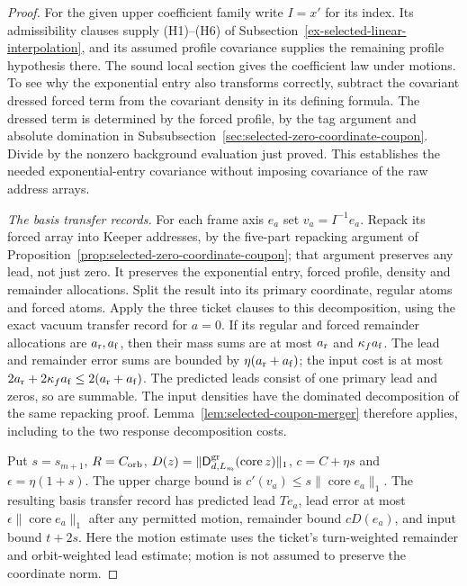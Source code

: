 \begin{proof}
For the given upper coefficient family write $I=x'$ for its index. Its admissibility
clauses supply (H1)--(H6) of
Subsection~\ref{ex-selected-linear-interpolation}, and its assumed
profile covariance supplies the remaining profile hypothesis there.
The sound local section gives the coefficient law under motions.
To see why the exponential entry also transforms correctly, subtract
the covariant dressed forced term from the covariant density in its
defining formula. The dressed term is determined by the forced
profile, by the tag argument and absolute domination in
Subsubsection~\ref{sec:selected-zero-coordinate-coupon}. Divide by the
nonzero background evaluation just proved. This establishes the
needed exponential-entry covariance without imposing covariance of
the raw address arrays.

\emph{The basis transfer records.}
For each frame axis $e_a$ set $v_a=I^{-1}e_a$. Repack its forced
array into Keeper addresses, by the five-part repacking argument of
Proposition~\ref{prop:selected-zero-coordinate-coupon}; that argument
preserves any lead, not just zero. It preserves the exponential
entry, forced profile, density and remainder allocations. Split the
result into its primary coordinate, regular atoms and forced atoms.
Apply the three ticket clauses to this decomposition, using the exact
vacuum transfer record for $a=0$. If its regular and forced remainder
allocations are $a_{\rm r},a_{\rm f}$, then their mass sums are
at most $a_{\rm r}$ and $\kappa_f a_{\rm f}$. The lead and remainder
error sums are bounded by $\eta(a_{\rm r}+a_{\rm f})$; the input
cost is at most $2a_{\rm r}+2\kappa_f a_{\rm f}\le2(a_{\rm r}+a_{\rm f})$.
The predicted leads consist of one primary lead and zeros, so are
summable. The input densities have the dominated decomposition of
the same repacking proof. Lemma~\ref{lem:selected-coupon-merger}
therefore applies, including to the two response decomposition costs.

Put $s=s_{m+1}$, $R=C_{\rm orb}$,
$D(z)=\|\mathsf D^{\rm gr}_{d,L_m}(\operatorname{core}z)\|_1$,
$c=C+\eta s$ and $\epsilon=\eta(1+s)$.
The upper charge bound is $c'(v_a)\le s\|\operatorname{core}e_a\|_1$.
The resulting basis transfer record has predicted lead $Te_a$, lead error
at most $\epsilon\|\operatorname{core}e_a\|_1$ after any permitted
motion, remainder bound $cD(e_a)$, and input bound $t+2s$.
Here the motion estimate uses the ticket's turn-weighted remainder
and orbit-weighted lead estimate; motion is not assumed to preserve
the coordinate norm.


\end{proof}
